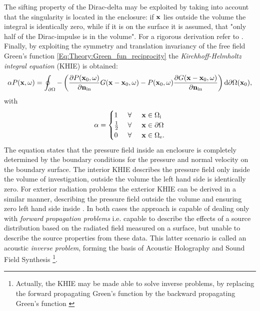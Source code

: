 The sifting property of the Dirac-delta may be exploited by taking into account that the singularity is located in the enclosure:
if $\mathbf{x}$ lies outside the volume the integral is identically zero, while if it is on the surface it is assumed, that "only half of the Dirac-impulse is in the volume".
For a rigorous derivation refer to \cite{Williams1999}.
Finally, by exploiting the symmetry and translation invariancy of the free field Green's function \eqref{Eq:Theory:Green_fun_reciprocity} the \emph{Kirchhoff-Helmholtz integral equation} (KHIE) is obtained:
\begin{equation}
\alpha P(\mathbf{x},\omega) = 
\oint_{\partial \Omega} - \left( 
\frac{\partial P(\mathbf{x}_0,\omega)}{\partial \mathbf{n}_{\mathrm{in}}} G(\mathbf{x}-\mathbf{x}_0,\omega)
-
P(\mathbf{x}_0,\omega)  \frac{\partial G(\mathbf{x}-\mathbf{x}_0,\omega)}{\partial\mathbf{n}_{\mathrm{in}}} 
\right)   \mathrm{d} \partial \Omega( \mathbf{x}_0),
\label{Eq:Theory:Kirchhoff-Helmholtz}
\end{equation}
with
\begin{equation*}
\alpha = \begin{cases} 
1           & \hspace{1mm} \forall \hspace{5mm}  \mathbf{x} \in \Omega_{\mathrm{i}}  	   \\
\frac{1}{2} & \hspace{1mm} \forall \hspace{5mm}  \mathbf{x} \in \partial \Omega  \\
0 			& \hspace{1mm} \forall \hspace{5mm}  \mathbf{x} \in \Omega_{\mathrm{e}}.
\end{cases}
\end{equation*}
The equation states that the pressure field inside an enclosure is completely determined by the boundary conditions for the pressure and normal velocity on the boundary surface.
The interior KHIE describes the pressure field only inside the volume of investigation, outside the volume the left hand side is identically zero. 
For exterior radiation problems the exterior KHIE can be derived in a similar manner, describing the pressure field outside the volume and ensuring zero left hand side inside \cite{Williams1999}.
In both cases the approach is capable of dealing only with \emph{forward propagation problems} i.e. capable to describe the effects of a source distribution based on the radiated field measured on a surface, but unable to describe the source properties from these data. 
This latter scenario is called an acoustic \emph{inverse problem}, forming the basis of Acoustic Holography and Sound Field Synthesis 
\footnote{Actually, the KHIE may be made able to solve inverse problems, by replacing the forward propagating Green's function by the backward propagating Green's function \cite{Wapenaar1989}}.
\vspace{3mm}

